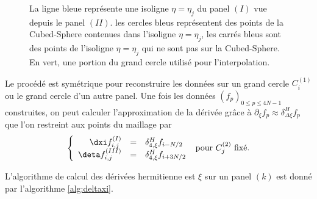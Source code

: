 \begin{figure}[htbp]
\begin{center}
\end{center}
\caption{La ligne bleue représente une isoligne $\eta=\eta_j$ du panel $(I)$ vue depuis le panel $(II)$. les cercles bleus représentent des points de la Cubed-Sphere contenues dans l'isoligne $\eta=\eta_j$, les carrés bleus sont des points de l'isoligne $\eta=\eta_j$ qui ne sont pas sur la Cubed-Sphere. En vert, une portion du grand cercle utilisé pour l'interpolation.}
\label{fig: panel II_interp2}
\end{figure}  

Le procédé est symétrique pour reconstruire les données sur un grand cercle $C_i^{(1)}$ ou le grand cercle d'un autre panel.
Une fois les données $(f_p)_{0 \leq p \leq 4N-1}$ construites, on peut calculer l'approximation de la dérivée grâce à $\partial_{\xi} f_p \approx \delta_{\Delta \xi}^H f_p$
que l'on restreint aux points du maillage par 
\begin{equation}
\left\lbrace
\begin{array}{rcl}
\dxi f_{i,j}^{(I)} & = & \delta_{4, \xi}^H f_{i-N/2}\\
\deta f_{i,j}^{(III)} & = & \delta_{4, \xi}^H f_{i+3N/2}
\end{array}
\right.
\text{ pour } C^{(2)}_j \text{ fixé.}
\end{equation}

L'algorithme de calcul des dérivées hermitienne est $\xi$ sur un panel $(k)$ est donné par l'algorithme \ref{alg:deltaxi}.

